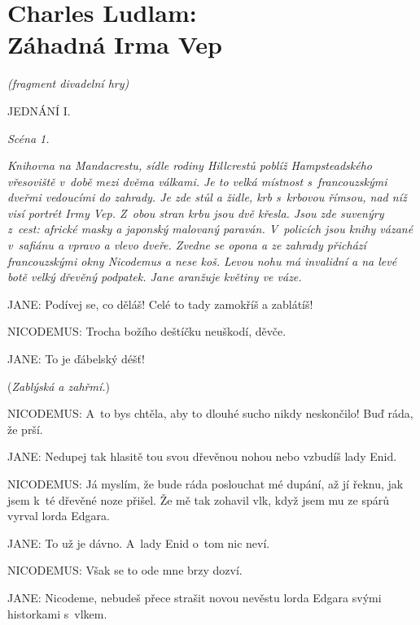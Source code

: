 \section{Charles Ludlam: \\ Záhadná Irma Vep}

\noindent
\textit{(fragment divadelní hry)}

\medskip

\noindent
JEDNÁNÍ I.

\medskip

\noindent
\textit{Scéna 1.}

\medskip

\noindent
\textit{Knihovna na Mandacrestu, sídle rodiny Hillcrestů poblíž Hamp\-steadského vřesoviště v době mezi dvěma válkami. Je to velká místnost s francouzskými dveřmi vedoucími do zahrady. Je zde stůl a židle, krb s krbovou římsou, nad níž visí portrét Irmy Vep. Z obou stran krbu jsou dvě křesla. Jsou zde suvenýry z cest: africké masky a japonský malovaný paraván. V policích jsou knihy vázané v safiánu a vpravo a vlevo dveře. Zvedne se opona a ze zahrady přichází francouzskými okny Nicodemus a nese koš. Levou nohu má invalidní a na levé botě velký dřevěný podpatek. Jane aranžuje květiny ve váze.}

\bigskip

\noindent
JANE: Podívej se, co děláš! Celé to tady zamokříš a zablátíš!

\noindent
NICODEMUS: Trocha božího deštíčku neuškodí, děvče.

\noindent
JANE: To je ďábelský déšť!

\smallskip

\noindent
(\textit{Zablýská a zahřmí.})

\smallskip

\noindent
NICODEMUS: A~to bys chtěla, aby to dlouhé sucho nikdy neskončilo! Buď ráda, že prší.

\noindent
JANE: Nedupej tak hlasitě tou svou dřevěnou nohou nebo vzbudíš lady Enid.

\noindent
NICODEMUS: Já myslím, že bude ráda poslouchat mé dupání, až jí řeknu, jak jsem k té dřevěné noze přišel. Že mě tak zohavil vlk, když jsem mu ze spárů vyrval lorda Edgara.

\noindent
JANE: To už je dávno. A~lady Enid o~tom nic neví.

\noindent
NICODEMUS: Však se to ode mne brzy dozví.

\noindent
JANE: Nicodeme, nebudeš přece strašit novou nevěstu lorda Edgara svými historkami s vlkem.

